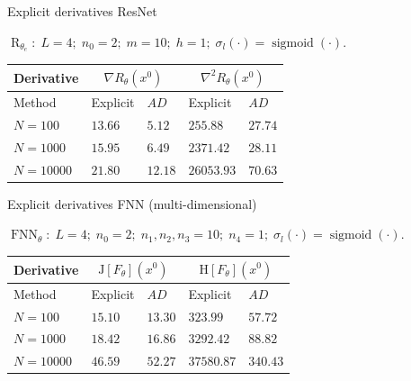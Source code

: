 \documentclass[9pt]{beamer}
\begin{document}
\begin{frame}{Explicit derivatives ResNet}

    $\operatorname{R}_{\theta_e} \colon \; L = 4; \; n_0 = 2; \; m = 10; \; h = 1; \; \sigma_l\left( \cdot \right) = \operatorname{sigmoid} \left( \cdot \right)$. \\  
    \vspace{5mm}
    \begin{table}[H]
        \resizebox{!}{!}
        {
            \begin{tabular}{l l l l l }
                \toprule
                Derivative & \multicolumn{2}{c}{$\nabla R_{\theta} \left(x^0 \right)$}& \multicolumn{2}{c}{$\nabla^2 R_{\theta} \left(x^0 \right)$} \\ 
                \midrule
                Method & Explicit & $AD$ & Explicit & $AD$ \\ 
                \midrule
                $N = 100$ & $13.66$ & $5.12$ & $255.88$ & $27.74$ \\ 
                \midrule
                $N = 1000$ & $15.95$ & $6.49$ & $2371.42$ & $28.11$ \\ 
                \midrule
                $N = 10000$ & $21.80$ & $12.18$ & $26053.93$ & $70.63$ \\ 
                \bottomrule
            \end{tabular}
        }
    \end{table}
\end{frame}



\begin{frame}{Explicit derivatives FNN (multi-dimensional)}

    $\operatorname{FNN}_{\theta} \colon \; L = 4; \; n_0 = 2; \; n_1, n_2, n_3 = 10; \; n_4 = 1; \; \sigma_l\left( \cdot \right) = \operatorname{sigmoid} \left( \cdot \right)$. \\ 
    \vspace{5mm}
    \begin{table}[H]
        \resizebox{!}{!}
        {
            \begin{tabular}{l l l l l }
                \toprule
                Derivative & \multicolumn{2}{c}{$\mathrm{J} \left[ F_{\theta} \right]\left(x^0\right)$}& \multicolumn{2}{c}{$\mathrm{H} \left[F_{\theta} \right]\left(x^0\right)$} \\ 
                \midrule
                Method & Explicit & $AD$ & Explicit & $AD$ \\ 
                \midrule
                $N = 100$ & $15.10$ & $13.30$ & $323.99$ & $57.72$ \\ 
                \midrule
                $N = 1000$ & $18.42$ & $16.86$ & $3292.42$ & $88.82$ \\ 
                \midrule
                $N = 10000$ & $46.59$ & $52.27$ & $37580.87$ & $340.43$ \\ 
                \bottomrule
            \end{tabular}
        }
    \end{table}
\end{frame}
\end{document}
